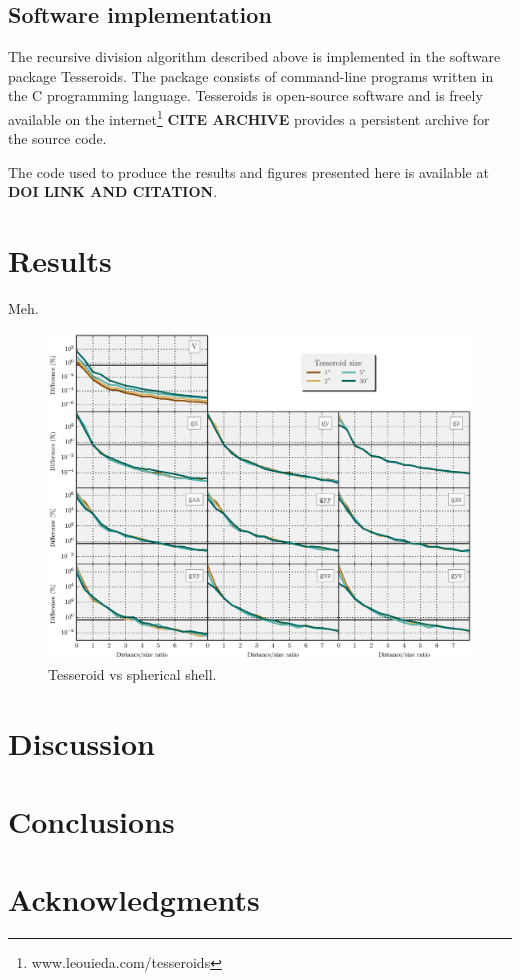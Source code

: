 \subsection{Software implementation}

The recursive division algorithm described above
is implemented in the software package
Tesseroids.
The package consists
of command-line programs
written in the C programming language.
Tesseroids is open-source software
and is freely available
on the internet\footnote{www.leouieda.com/tesseroids}
\textbf{CITE ARCHIVE} provides a persistent
archive for the source code.

The code used to produce the results and figures presented here
is available at \textbf{DOI LINK AND CITATION}.


\section{Results}

Meh.

\begin{figure}
    \centering
    \includegraphics[width=\textwidth]{figs/tesseroid-x-shell}
    \caption{
        Tesseroid vs spherical shell.
    }
    \label{fig:tesseroid-x-shell}
\end{figure}

\section{Discussion}

\section{Conclusions}

\section{Acknowledgments}
